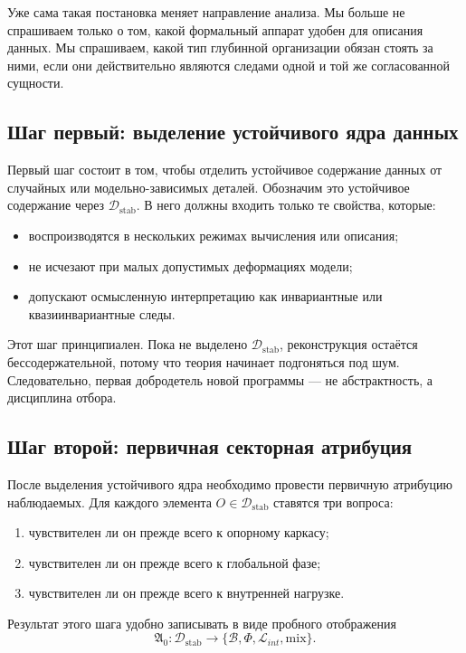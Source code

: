 \documentclass[12pt,a4paper]{article}
\begin{document}
Уже сама такая постановка меняет направление анализа. Мы больше не спрашиваем только о том, какой формальный аппарат удобен для описания данных. Мы спрашиваем, какой тип глубинной организации обязан стоять за ними, если они действительно являются следами одной и той же согласованной сущности.

\subsection{Шаг первый: выделение устойчивого ядра данных}

Первый шаг состоит в том, чтобы отделить устойчивое содержание данных от случайных или модельно-зависимых деталей. Обозначим это устойчивое содержание через \(\mathcal{D}_{\mathrm{stab}}\). В него должны входить только те свойства, которые:
\begin{itemize}
    \item воспроизводятся в нескольких режимах вычисления или описания;
    \item не исчезают при малых допустимых деформациях модели;
    \item допускают осмысленную интерпретацию как инвариантные или квазиинвариантные следы.
\end{itemize}

Этот шаг принципиален. Пока не выделено \(\mathcal{D}_{\mathrm{stab}}\), реконструкция остаётся бессодержательной, потому что теория начинает подгоняться под шум. Следовательно, первая добродетель новой программы --- не абстрактность, а дисциплина отбора.

\subsection{Шаг второй: первичная секторная атрибуция}

После выделения устойчивого ядра необходимо провести первичную атрибуцию наблюдаемых. Для каждого элемента \(O \in \mathcal{D}_{\mathrm{stab}}\) ставятся три вопроса:
\begin{enumerate}
    \item чувствителен ли он прежде всего к опорному каркасу;
    \item чувствителен ли он прежде всего к глобальной фазе;
    \item чувствителен ли он прежде всего к внутренней нагрузке.
\end{enumerate}

Результат этого шага удобно записывать в виде пробного отображения
\begin{equation}
\mathfrak{A}_0 : \mathcal{D}_{\mathrm{stab}} \longrightarrow \{\mathcal{B},\Phi,\mathcal{L}_{int},\mathrm{mix}\}.
\end{equation}
\end{document}

